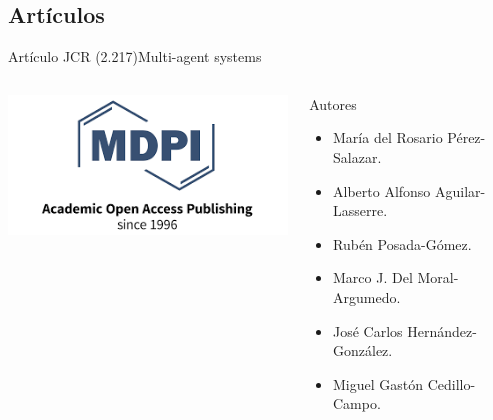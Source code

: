 \documentclass{beamer}
\begin{document}
    \subsection{Artículos}
    \begin{frame}{Artículo JCR (2.217)}{Multi-agent systems}
        \begin{columns}
            \includegraphics[width=\columnwidth]{mdpi}
    
            \begin{block}{Autores}{
                \begin{itemize}
                    \item María del Rosario Pérez-Salazar.
                    \item Alberto Alfonso Aguilar-Lasserre.
                    \item Rubén Posada-Gómez.
                    \item Marco J. Del Moral-Argumedo.
                    \item José Carlos Hernández-González.
                    \item Miguel Gastón Cedillo-Campo.
                \end{itemize}
            }
                
            \end{block}
        \end{columns}
    \end{frame}
\end{document}
